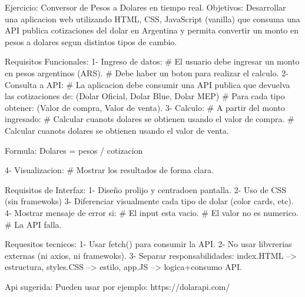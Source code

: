 Ejercicio: Conversor de Pesos a Dolares en tiempo real.
Objetivos: Desarrollar una aplicacion web utilizando HTML, CSS, JavaScript (vanilla) que consuma una API publica cotizaciones del dolar en Argentina y permita convertir un monto en pesos a dolares segun distintos tipos de cambio.

Requisitos Funcionales:
1- Ingreso de datos:
   # El usuario debe ingresar un monto en pesos argentinos (ARS).
   # Debe haber un boton para realizar el calculo.
2- Consulta a API:
    # La aplicacion debe consumir una API publica que devuelva las cotizaciones de: (Dolar Oficial, Dolar Blue, Dolar MEP)
    # Para cada tipo obtener: (Valor de compra, Valor de venta).
3- Calculo:
    # A partir del monto ingresado:
        # Calcular cuanots dolares se obtienen usando el valor de compra.
        # Calcular cuanots dolares se obtienen usando el valor de venta.

Formula:
Dolares = pesos / cotizacion

4- Visualizacion:
    # Mostrar los resultados de forma clara.

Requisitos de Interfaz:
1- Diseño prolijo y centradoen pantalla.
2- Uso de CSS (sin framewoks)
3- Diferenciar visualmente cada tipo de dolar (color cards, etc).
4- Mostrar mensaje de error si:
    # El input esta vacio.
    # El valor no es numerico.
    # La API falla.

Requesitos tecnicos:
1- Usar fetch() para consumir la API.
2- No usar libvrerias externas (ni axios, ni framewoks).
3- Separar responsabilidades: index.HTML --> estructura, styles.CSS --> estilo, app.JS --> logica+consumo API.

Api sugerida: Pueden usar por ejemplo:  https://dolarapi.com/
